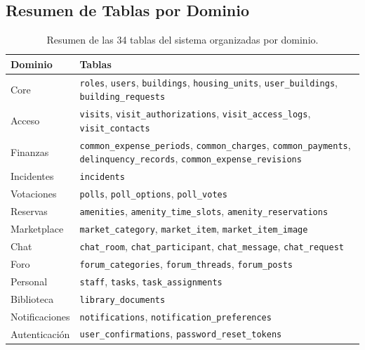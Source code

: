 \subsection{Resumen de Tablas por Dominio}

\begin{table}[H]
\centering
\small
\begin{tabular}{|l|p{}|}
\hline
\textbf{Dominio} & \textbf{Tablas} \\ \hline
Core & \texttt{roles}, \texttt{users}, \texttt{buildings}, \texttt{housing\_units}, \texttt{user\_buildings}, \texttt{building\_requests} \\ \hline
Acceso & \texttt{visits}, \texttt{visit\_authorizations}, \texttt{visit\_access\_logs}, \texttt{visit\_contacts} \\ \hline
Finanzas & \texttt{common\_expense\_periods}, \texttt{common\_charges}, \texttt{common\_payments}, \texttt{delinquency\_records}, \texttt{common\_expense\_revisions} \\ \hline
Incidentes & \texttt{incidents} \\ \hline
Votaciones & \texttt{polls}, \texttt{poll\_options}, \texttt{poll\_votes} \\ \hline
Reservas & \texttt{amenities}, \texttt{amenity\_time\_slots}, \texttt{amenity\_reservations} \\ \hline
Marketplace & \texttt{market\_category}, \texttt{market\_item}, \texttt{market\_item\_image} \\ \hline
Chat & \texttt{chat\_room}, \texttt{chat\_participant}, \texttt{chat\_message}, \texttt{chat\_request} \\ \hline
Foro & \texttt{forum\_categories}, \texttt{forum\_threads}, \texttt{forum\_posts} \\ \hline
Personal & \texttt{staff}, \texttt{tasks}, \texttt{task\_assignments} \\ \hline
Biblioteca & \texttt{library\_documents} \\ \hline
Notificaciones & \texttt{notifications}, \texttt{notification\_preferences} \\ \hline
Autenticación & \texttt{user\_confirmations}, \texttt{password\_reset\_tokens} \\ \hline
\end{tabular}
\caption{Resumen de las 34 tablas del sistema organizadas por dominio.}
\end{table}
